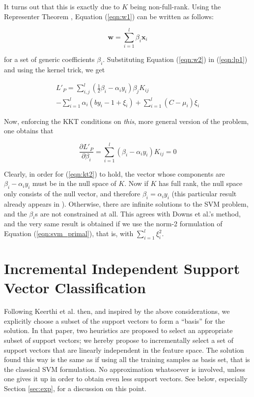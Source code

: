 \documentclass[10pt,twocolumn,letterpaper]{article}
\def\xx{\mathbf{x}}
\def\ww{\mathbf{w}}
\begin{document}
It turns out that this is exactly due to $K$ being
non-full-rank. Using the Representer Theorem
\cite{CoxOS90,KimeldorfW70}, Equation (\ref{eqn:w1}) can be written as
follows:

\begin{equation} \label{eqn:w2}
  \ww = \sum_{i=1}^l \beta_i \xx_i
\end{equation}

for a set of generic coefficients $\beta_i$. Substituting Equation
(\ref{eqn:w2}) in (\ref{eqn:lp1}) and using the kernel trick, we get

\begin{eqnarray} \label{eqn:svm_primal_general}
  L'_P =   \sum_{i,j}^l \left( \frac{1}{2}\beta_i-\alpha_i y_i \right) \beta_j K_{ij} \\
         - \sum_{i=1}^l \alpha_i (b y_i -1 +\xi_i) + \sum_{i=1}^l (C - \mu_i) \xi_i \nonumber
\end{eqnarray}

Now, enforcing the KKT conditions on \emph{this}, more general version
of the problem, one obtains that

\begin{equation} \label{eqn:kt2}
  \frac{\partial L'_P}{\partial \beta_i} = \sum_{i=1}^l (\beta_i - \alpha_i y_i) K_{ij} = 0
\end{equation}

Clearly, in order for (\ref{eqn:kt2}) to hold, the vector whose
components are $\beta_i-\alpha_i y_i$ must be in the null space of
$K$. Now if $K$ has full rank, the null space only consists of the
null vector, and therefore $\beta_i = \alpha_i y_i$ (this particular
result already appears in \cite{KeerthiCDC06}). Otherwise, there are
infinite solutions to the SVM problem, and the $\beta_i$s are not
constrained at all. This agrees with Downs et al.'s method, and the
very same result is obtained if we use the norm-2 formulation of
Equation (\ref{eqn:svm_primal}), that is, with $\sum_{i=1}^l \xi_i^2$.

\section{Incremental Independent Support Vector Classification}
\label{sec:opt}

Following Keerthi et al. \cite{KeerthiCDC06} then, and inspired by the
above considerations, we explicitly choose a subset of the support
vectors to form a ``basis'' for the solution. In that paper, two
heuristics are proposed to select an appropriate subset of support
vectors; we hereby propose to incrementally select a set of support
vectors that are linearly independent in the feature space. The
solution found this way is the same as if using all the training
samples as basis set, that is the classical SVM formulation. No
approximation whatsoever is involved, unless one gives it up in order
to obtain even less support vectors. See below, especially Section
\ref{sec:exp}, for a discussion on this point.
\end{document}
